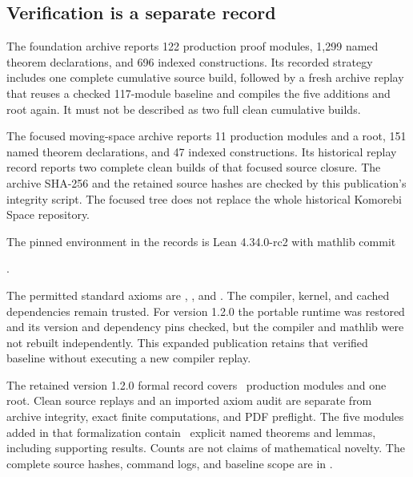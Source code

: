 

\par\noindent\begin{minipage}{\linewidth}\subsection{Verification is a separate record}
The foundation archive reports 122 production proof modules, 1,299 named theorem declarations, and 696 indexed constructions. Its recorded strategy includes one complete cumulative source build, followed by a fresh archive replay that reuses a checked 117-module baseline and compiles the five additions and root again. It must not be described as two full clean cumulative builds.

The focused moving-space archive reports 11 production modules and a root, 151 named theorem declarations, and 47 indexed constructions. Its historical replay record reports two complete clean builds of that focused source closure. The archive SHA-256 and the retained source hashes are checked by this publication's integrity script. The focused tree does not replace the whole historical Komorebi Space repository.

The pinned environment in the records is Lean 4.34.0-rc2 with mathlib commit\par\smallskip\noindent{}.\par\smallskip The permitted standard axioms are , , and . The compiler, kernel, and cached dependencies remain trusted. For version 1.2.0 the portable runtime was restored and its version and dependency pins checked, but the compiler and mathlib were not rebuilt independently. This expanded publication retains that verified baseline without executing a new compiler replay.

The retained version 1.2.0 formal record covers \EditionFormalModules\ production modules and one root. Clean source replays and an imported axiom audit are separate from archive integrity, exact finite computations, and PDF preflight. The five modules added in that formalization contain \EditionNewTheorems\ explicit named theorems and lemmas, including supporting results. Counts are not claims of mathematical novelty. The complete source hashes, command logs, and baseline scope are in .

\end{minipage}

